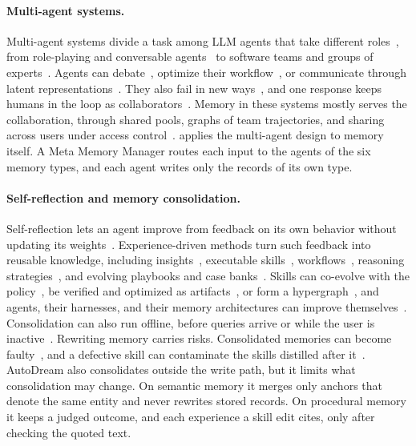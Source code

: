 \paragraph{Multi-agent systems.}
Multi-agent systems divide a task among LLM agents that take different
roles~\citep{guo2024masurvey,luo2025agentsurvey}, from role-playing and
conversable agents~\citep{li2023camel,wu2024autogen} to software teams and
groups of experts~\citep{hong2024metagpt,qian2024chatdev,chen2024agentverse}.
Agents can debate~\citep{du2024debate,liang2024debate,huang2026madiave},
optimize their workflow~\citep{zhuge2024gptswarm,zhang2025aflow}, or
communicate through latent representations~\citep{yang2026xbridge}. They also
fail in new ways~\citep{cemri2025mas,huang2026believed}, and one response keeps
humans in the loop as
collaborators~\citep{zou2026hasurvey,zou2025collabintel,wu2026hasbench}. Memory
in these systems mostly serves the collaboration, through shared pools, graphs
of team trajectories, and sharing across users under access
control~\citep{memory_sharing,zhang2025gmemory,rezazadeh2025collabmemory}.
\ours applies the multi-agent design to memory itself. A Meta Memory Manager
routes each input to the agents of the six memory types, and each agent writes
only the records of its own type.

\paragraph{Self-reflection and memory consolidation.}
Self-reflection lets an agent improve from feedback on its own behavior without
updating its
weights~\citep{shinn2023reflexion,madaan2023selfrefine,park2023generative,zhao2025marco}.
Experience-driven methods turn such feedback into reusable knowledge, including
insights~\citep{zhao2024expel}, executable skills~\citep{wang2024voyager},
workflows~\citep{wang2025awm}, reasoning
strategies~\citep{ouyang2026reasoningbank}, and evolving playbooks and case
banks~\citep{suzgun2025cheatsheet,zhang2026ace,fang2026memp,zhou2025memento}.
Skills can co-evolve with the policy~\citep{xia2026skillrl,xia2026metaclaw}, be
verified and optimized as
artifacts~\citep{zhang2026coevoskills,ma2026skillneo}, or form a
hypergraph~\citep{xu2026hyperskill}, and agents, their harnesses, and their
memory architectures can improve
themselves~\citep{xia2026agent0,xia2026rrsi,liu2026evolvemem,gao2026selfevolving,fang2025selfevolving}.
Consolidation can also run offline, before queries arrive or while the user is
inactive~\citep{lin2025sleeptime,fang2026lightmem,xia2026metaclaw,ye2026autodreamer}.
Rewriting memory carries risks. Consolidated memories can become
faulty~\citep{zhang2026faultymemories}, and a defective skill can contaminate
the skills distilled after it~\citep{shang2026backfires}. AutoDream also
consolidates outside the write path, but it limits what consolidation may
change. On semantic memory it merges only anchors that denote the same entity
and never rewrites stored records. On procedural memory it keeps a judged
outcome, and each experience a skill edit cites, only after checking the
quoted text.
